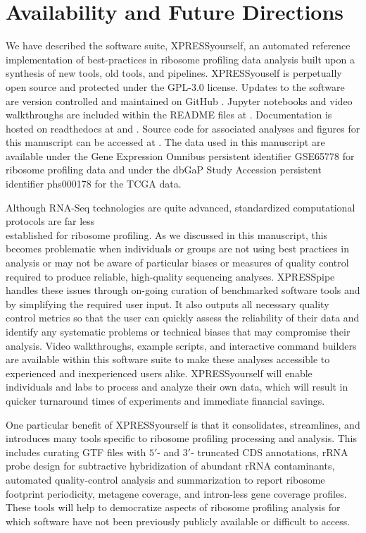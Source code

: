 \documentclass[10pt, oneside]{article}
\begin{document}
\section*{Availability and Future Directions}
We have described the software suite, XPRESSyourself, an automated reference implementation of best-practices in ribosome profiling data analysis built upon a synthesis of new tools, old tools, and pipelines. XPRESSyouself is perpetually open source and protected under the GPL-3.0 license. Updates to the software are version controlled and maintained on GitHub \cite{xpressyourself}. Jupyter notebooks and video walkthroughs are included within the README files at \cite{xpressyourself}. Documentation is hosted on readthedocs \cite{readthedocs} at \cite{xpresspipe_docs} and \cite{xpressplot_docs}. Source code for associated analyses and figures for this manuscript can be accessed at \cite{manuscript}. The data used in this manuscript are available under the Gene Expression Omnibus persistent identifier GSE65778 \cite{isrib_geo} for ribosome profiling data and under the dbGaP Study Accession persistent identifier phs000178 \cite{tcga_data} for the TCGA data.\par

Although RNA-Seq technologies are quite advanced, standardized computational protocols are far less \\established for ribosome profiling. As we discussed in this manuscript, this becomes problematic when individuals or groups are not using best practices in analysis or may not be aware of particular biases or measures of quality control required to produce reliable, high-quality sequencing analyses. XPRESSpipe handles these issues through on-going curation of benchmarked software tools and by simplifying the required user input. It also outputs all necessary quality control metrics so that the user can quickly assess the reliability of their data and identify any systematic problems or technical biases that may compromise their analysis. Video walkthroughs, example scripts, and interactive command builders are available within this software suite to make these analyses accessible to experienced and inexperienced users alike. XPRESSyourself will enable individuals and labs to process and analyze their own data, which will result in quicker turnaround times of experiments and immediate financial savings.\par

One particular benefit of XPRESSyourself is that it consolidates, streamlines, and introduces many tools specific to ribosome profiling processing and analysis. This includes curating GTF files with $5'$- and $3'$- truncated CDS annotations, rRNA probe design for subtractive hybridization of abundant rRNA contaminants, automated quality-control analysis and summarization to report ribosome footprint periodicity, metagene coverage, and intron-less gene coverage profiles. These tools will help to democratize aspects of ribosome profiling analysis for which software have not been previously publicly available or difficult to access.\par
\end{document}
